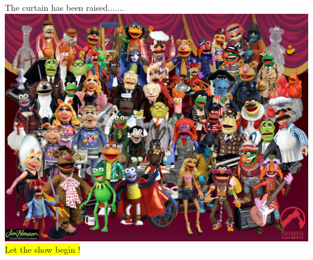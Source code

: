 \Tr
\onecolumn
\begin{center}
{\blue The curtain has been raised.......}\\[5mm]
\includegraphics[keepaspectratio,width=18cm]{muppets}\\
\colorbox{yellow}{Let the show begin !}
\end{center}
